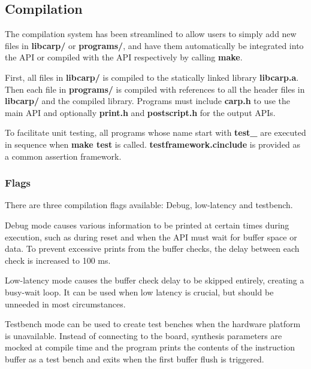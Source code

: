 \subsection{Compilation}

The compilation system has been streamlined to allow users to simply add new files in \textbf{libcarp/} or \textbf{programs/}, and have them automatically be integrated into the API or compiled with the API respectively by calling \textbf{make}.

First, all files in \textbf{libcarp/} is compiled to the statically linked library \textbf{libcarp.a}.
Then each file in \textbf{programs/} is compiled with references to all the header files in \textbf{libcarp/} and the compiled library.
Programs must include \textbf{carp.h} to use the main API and optionally \textbf{print.h} and \textbf{postscript.h} for the output APIs.

To facilitate unit testing, all programs whose name start with \textbf{test\_} are executed in sequence when \textbf{make test} is called.
\textbf{testframework.cinclude} is provided as a common assertion framework.

\subsubsection{Flags}

There are three compilation flags available: Debug, low-latency and testbench.

Debug mode causes various information to be printed at certain times during execution, such as during reset and when the API must wait for buffer space or data.
To prevent excessive prints from the buffer checks, the delay between each check is increased to 100 ms.

Low-latency mode causes the buffer check delay to be skipped entirely, creating a busy-wait loop.
It can be used when low latency is crucial, but should be unneeded in most circumstances.

Testbench mode can be used to create test benches when the hardware platform is unavailable.
Instead of connecting to the board, synthesis parameters are mocked at compile time and the program prints the contents of the instruction buffer as a test bench and exits when the first buffer flush is triggered.
